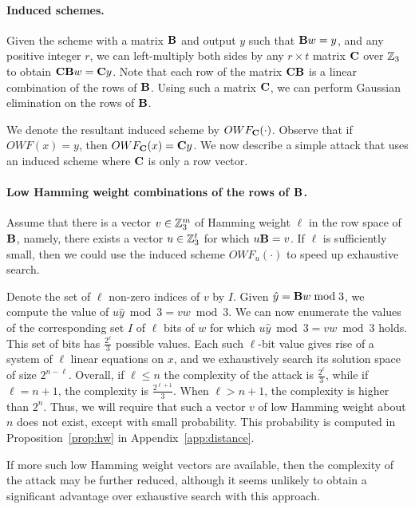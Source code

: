 \paragraph{Induced schemes.}
Given the scheme \ttOWF with a matrix $\mat{B}$ and output $y$ such that $\mat{B}w = y$, and any positive integer $r$, we can left-multiply both sides by any $r \times t$ matrix $\mat{C}$ over $\mathbb{Z}_3$ to obtain $\mat{C}\mat{B}w = \mat{C}y$. Note that each row of the matrix $\mat{CB}$ is a linear combination of the rows of $\mat{B}$. Using such a matrix $\mat{C}$, we can perform Gaussian elimination on the rows of $\mat{B}$.

We denote the resultant induced scheme by $OWF_\mat{C}(\cdot)$. Observe that if $OWF(x) = y$, then $OWF_\mat{C}(x) = \mat{C}y$.
We now describe a simple attack that uses an induced scheme where $\mat{C}$ is only a row vector.

\paragraph{Low Hamming weight combinations of the rows of $\mat{B}$.}
Assume that there is a vector $v \in \mathbb{Z}_3^m$ of Hamming weight $\ell$ in the row space of $\mat{B}$, namely, there exists a vector $u \in \mathbb{Z}_3^t$ for which $u \mat{B} = v$. If $\ell$ is sufficiently small, then we could use the induced scheme $OWF_u(\cdot)$ to speed up exhaustive search.

Denote the set of $\ell$ non-zero indices of $v$ by $I$. Given $\hat{y} = \mat{B}w \bmod 3$, we compute the value of $u\hat{y} \bmod 3 = vw \bmod 3$. We can now enumerate the values of the corresponding set $I$ of $\ell$ bits of $w$ for which $u\hat{y} \bmod 3 = vw \bmod 3$ holds. This set of bits has $\tfrac{2^\ell}{3}$ possible values. Each such $\ell$-bit value gives rise of a system of $\ell$ linear equations on $x$, and we exhaustively search its solution space of size $2^{n-\ell}$. Overall, if $\ell \leq n$ the complexity of the attack is
$\tfrac{2^{\ell}}{3}$, while if $\ell = n+1$, the complexity is $\tfrac{2^{\ell+1}}{3}$. When $\ell > n+1$, the complexity is higher than $2^n$.
Thus, we will require that such a vector $v$ of low Hamming weight about $n$ does not exist, except with small probability.
This probability is computed in Proposition~\ref{prop:hw} in Appendix~\ref{app:distance}.

If more such low Hamming weight vectors are available, then the complexity of the attack may be further reduced,
although it seems unlikely to obtain a significant advantage over exhaustive search with this approach.


